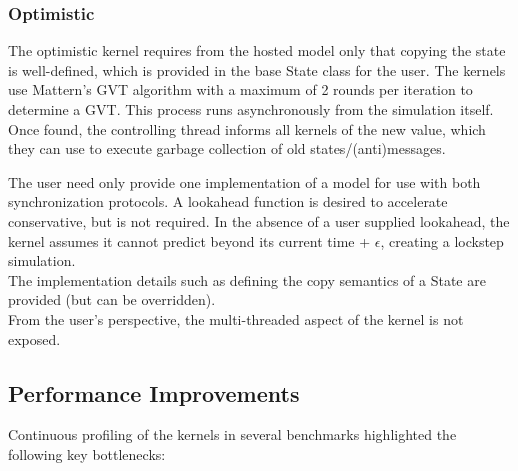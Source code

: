 \subsubsection{Optimistic}
The optimistic kernel requires from the hosted model only that copying the state is well-defined, which is provided in the base State class for the user. 
The kernels use Mattern's \cite{mattern}
GVT algorithm with a maximum of 2 rounds per iteration to determine a GVT. This process runs asynchronously from the simulation itself. Once found, the controlling thread informs all kernels of the new value, which they can use to execute garbage collection of old states/(anti)messages. 

The user need only provide one implementation of a model for use with both synchronization protocols. A lookahead function is desired to accelerate conservative, but is not required. In the absence of a user supplied lookahead, the kernel assumes it cannot predict beyond its current time + $\epsilon$, creating a lockstep simulation. %
\\
The implementation details such as defining the copy semantics of a State are provided (but can be overridden). \\
From the user's perspective, the multi-threaded aspect of the kernel is not exposed. %

\subsection{Performance Improvements}
Continuous profiling of the kernels in several benchmarks highlighted the following key bottlenecks: 
